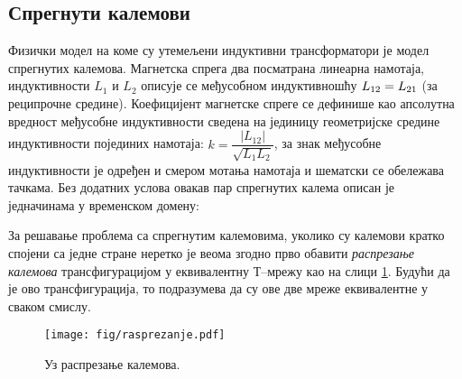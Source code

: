 \subsection*{Спрегнути калемови}
Физички модел на коме су утемељени индуктивни трансформатори је модел 
спрегнутих калемова. Магнетска спрега два посматрана линеарна намотаја,
индуктивности $L_1$ и $L_2$ описује се
међусобном индуктивношћу $L_{\rm 12} = L_{\rm 21}$ (за реципрочне средине). Коефицијент магнетске спреге се дефинише као апсолутна 
вредност међусобне индуктивности сведена на јединицу геометријске
средине индуктивности појединих намотаја: 
$k = \dfrac{|L_{12}|}{\sqrt{L_1 L_2}}$, за знак међусобне 
индуктивности је одређен и смером мотања намотаја и шематски 
се обележава тачкама. Без додатних услова овакав пар спрегнутих 
калема описан је једначинама у временском домену:

\begin{center}
\end{center}

За решавање проблема са спрегнутим калемовима, уколико су калемови 
кратко спојени са једне стране неретко је веома згодно прво обавити \textit{распрезање калемова} трансфигурацијом у еквивалентну
Т--мрежу као на слици \ref{raspreg}. Будући да је ово трансфигурација, 
то подразумева да су ове две мреже еквивалентне у сваком смислу.

\begin{figure}[ht!]
\centering
\texttt{[image: fig/rasprezanje.pdf]}
\caption{Уз распрезање калемова.}
\label{raspreg}
\end{figure}


